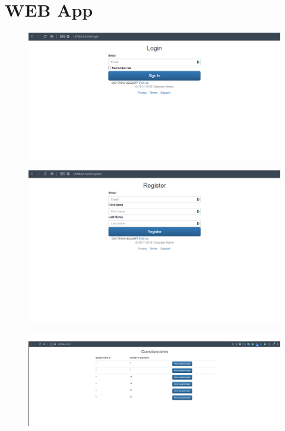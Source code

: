 \documentclass[12pt, oneside, a4paper]{article}
\begin{document}
    \section{WEB App}
    \FloatBarrier
    \begin{figure}[H] 
        \centerline{
        \includegraphics[width=\textwidth]{web_login.PNG}
        }
    \end{figure}
    \FloatBarrier
    \begin{figure}[H] 
        \centerline{
        \includegraphics[width=\textwidth]{web_register.PNG}
        }
    \end{figure}
    \FloatBarrier
    \begin{figure}[H] 
        \centerline{
        \includegraphics[width=\textwidth]{web_questionnaires.PNG}
        }
    \end{figure}
\end{document}
